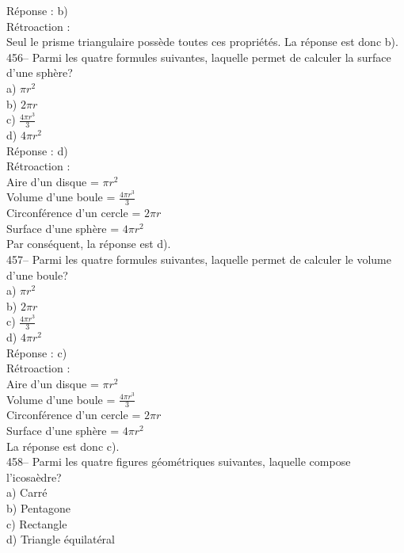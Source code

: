 ﻿\documentclass[letterpaper, 12pt]{article}
\begin{document}
R\'eponse : b)\\

R\'etroaction :\\
Seul le prisme triangulaire poss\`ede toutes ces propri\'et\'es.  La
r\'eponse est donc b).\\

456-- Parmi les quatre formules suivantes, laquelle permet de calculer la
surface d'une sph\`ere?\\
a) $\pi r^{2}$\\
b) $2\pi r$\\
c) $\frac{4\pi r^{3}}{3}$\\
d) $4\pi r^{2}$\\

R\'eponse : d)\\

R\'etroaction : \\
Aire d'un disque =  $\pi r^{2}$\\[2mm]
Volume d'une boule = $\frac{4\pi r^{3}}{3}$\\[2mm]
Circonf\'erence d'un cercle = $2\pi r$\\[2mm]
Surface d'une sph\`ere = $4\pi r^{2}$\\[2mm]
Par cons\'equent, la r\'eponse est d).\\

457-- Parmi les quatre formules suivantes, laquelle permet de calculer le
volume d'une boule?\\
a) $\pi r^{2}$\\
b) $2\pi r$\\
c) $\frac{4\pi r^{3}}{3}$\\
d) $4\pi r^{2}$\\

R\'eponse : c)\\

R\'etroaction : \\
Aire d'un disque =  $\pi r^{2}$\\[2mm]
Volume d'une boule = $\frac{4\pi r^{3}}{3}$\\[2mm]
Circonf\'erence d'un cercle = $2\pi r$\\[2mm]
Surface d'une sph\`ere = $4\pi r^{2}$\\[2mm]
La r\'eponse est donc c).\\

458-- Parmi les quatre figures g\'eom\'etriques suivantes, laquelle compose
l'icosa\`edre?\\
a) Carr\'e\\
b) Pentagone\\
c) Rectangle\\
d) Triangle \'equilat\'eral\\
\end{document}
